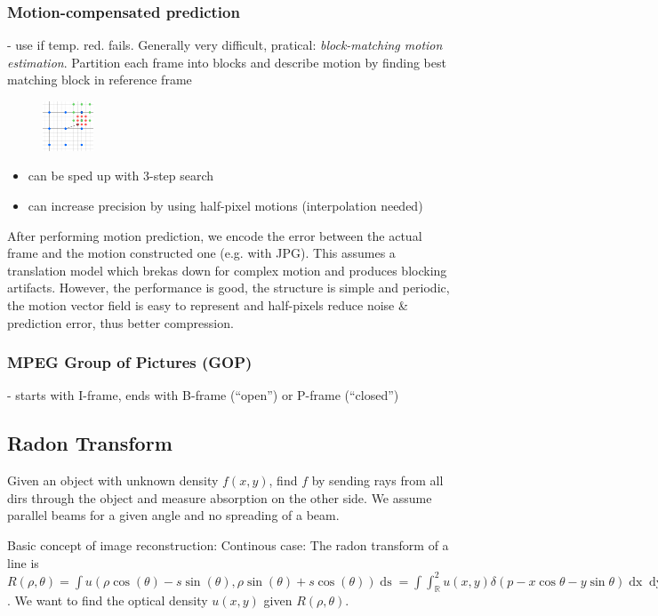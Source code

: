 \documentclass[a4paper,10pt]{article}
\begin{document}
\subsubsection{Motion-compensated prediction} - use if temp. red. fails. Generally very difficult, pratical: \textit{block-matching motion estimation}. Partition each frame into blocks and describe motion by finding best matching block in reference frame

\begin{figure} 
    \centering 
    \includegraphics[width=1.5cm]{three-step-search.png}
\end{figure}

\begin{itemize}
    \item can be sped up with 3-step search
    \item can increase precision by using half-pixel motions (interpolation needed)
\end{itemize}
After performing motion prediction, we encode the error between the actual frame and the motion constructed one (e.g. with JPG).
This assumes a translation model which brekas down for complex motion and produces blocking artifacts. However, the performance is good, the structure is simple and periodic, the motion vector field is easy to represent and half-pixels reduce noise \& prediction error, thus better compression.
\subsubsection{MPEG Group of Pictures (GOP)} - starts with I-frame, ends with B-frame (``open'') or P-frame (``closed'')

\subsection{Radon Transform}
Given an object with unknown density \( f(x,y) \), find \( f \) by sending rays from all dirs through the object and measure absorption on the other side. We assume parallel beams for a given angle and no spreading of a beam.

Basic concept of image reconstruction:
Continous case: The radon transform of a line is \( R(\rho , \theta) = \int u(\rho \cos (\theta ) - s \sin (\theta ), \rho \sin (\theta ) + s \cos (\theta )) \mathop{ds} = \int \int_\mathbb{R}^2 u(x,y) \delta (p - x \cos \theta - y \sin \theta ) \mathop{dx} \mathop{dy} \). We want to find the optical density \( u(x,y) \) given \( R(\rho , \theta ) \).
\end{document}
